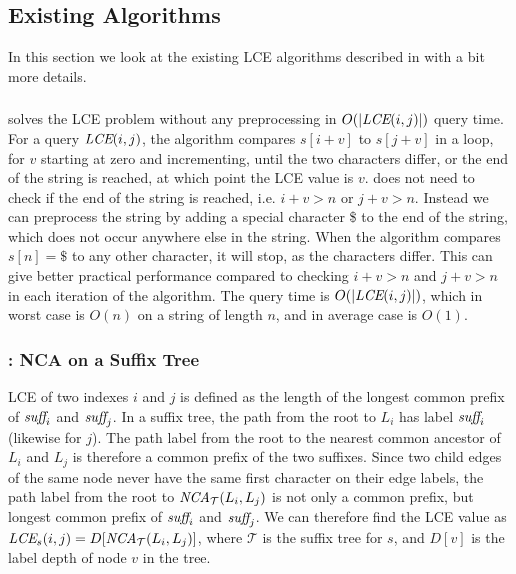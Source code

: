 \documentclass[a4]{article}
\newcommand*{\pref}{\prettyref}
\begin{document}
\subsection{Existing Algorithms}

In this section we look at the existing LCE algorithms described in \pref{sec:existing-results} with a bit more details.

\subsubsection{}

 solves the LCE problem without any preprocessing in $O(|\textit{LCE}(i,j)|)$ query time. For a query $\textit{LCE}(i,j)$, the algorithm compares $s[i+v]$ to $s[j+v]$ in a loop, for $v$ starting at zero and incrementing, until the two characters differ, or the end of the string is reached, at which point the LCE value is $v$.  does not need to check if the end of the string is reached, i.e. $i+v>n$ or $j+v>n$. Instead we can preprocess the string by adding a special character \$ to the end of the string, which does not occur anywhere else in the string. When the algorithm compares $s[n] = \$$ to any other character, it will stop, as the characters differ. This can give better practical performance compared to checking $i+v>n$ and $j+v>n$ in each iteration of the algorithm. The query time is $O(|\textit{LCE}(i,j)|)$, which in worst case is $O(n)$ on a string of length $n$, and in average case is $O(1)$.

\subsubsection{: NCA on a Suffix Tree}

LCE of two indexes $i$ and $j$ is defined as the length of the longest common prefix of $\textit{suff}_i$ and $\textit{suff}_j$. In a suffix tree, the path from the root to $L_i$ has label $\textit{suff}_i$ (likewise for $j$). The path label from the root to the nearest common ancestor of $L_i$ and $L_j$ is therefore a common prefix of the two suffixes. Since two child edges of the same node never have the same first character on their edge labels, the path label from the root to $\textit{NCA}_\mathcal{T}(L_i,L_j)$ is not only a common prefix, but longest common prefix of $\textit{suff}_i$ and $\textit{suff}_j$. We can therefore find the LCE value as $\textit{LCE}_s(i,j) = D[\textit{NCA}_\mathcal{T}(L_i,L_j)]$, where $\mathcal{T}$ is the suffix tree for $s$, and $D[v]$ is the label depth of node $v$ in the tree.
\end{document}
